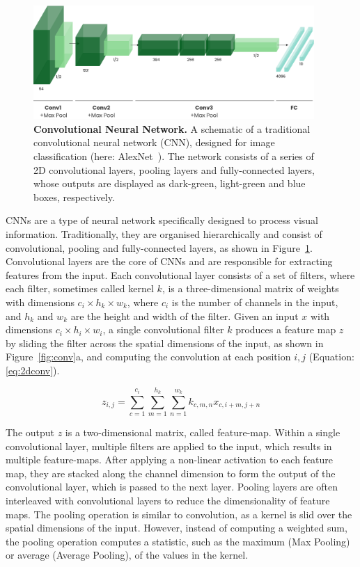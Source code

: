 \documentclass[a4paper]{article}
\begin{document}
\begin{figure}
  \begin{center}
    \includegraphics[width=0.95\textwidth]{./figures/alexnet.png}
  \end{center}
  \caption{\textbf{Convolutional Neural Network.} A schematic of a traditional
    convolutional neural network (CNN), designed for image classification (here:
    AlexNet~\cite{alexnet}). The network consists of a series of 2D
    convolutional layers, pooling layers and fully-connected layers, whose
  outputs are displayed as dark-green, light-green and blue boxes, respectively.
}
  \label{fig:cnn}
\end{figure}


CNNs are a type of neural network specifically designed to process visual
information. Traditionally, they are organised hierarchically and consist of
convolutional, pooling and fully-connected layers, as shown in
Figure~\ref{fig:cnn}. Convolutional layers are the core of CNNs and are
responsible for extracting features from the input. Each convolutional layer
consists of a set of filters, where each filter, sometimes called kernel $k$, is
a three-dimensional matrix of weights with dimensions $c_i \times h_k \times
w_k$, where $c_i$ is the number of channels in the input, and $h_k$ and $w_k$
are the height and width of the filter. Given an input $x$ with dimensions $c_i
\times h_i \times w_i$, a single convolutional filter $k$ produces a feature map
$z$ by sliding the filter across the spatial dimensions of the input, as shown
in Figure~\ref{fig:conv}a, and computing the convolution at each position
${i,j}$ (Equation: \ref{eq:2dconv}).

\begin{equation}
  z_{i,j} = \sum_{c=1}^{c_i} \sum_{m=1}^{h_k} \sum_{n=1}^{w_k} 
  k_{c,m,n} x_{c,i+m,j+n}
  \label{eq:2dconv}
\end{equation}

The output $z$ is a two-dimensional matrix, called feature-map. Within a single
convolutional layer, multiple filters are applied to the input, which results in
multiple feature-maps. After applying a non-linear activation to each feature
map, they are stacked along the channel dimension to form the output of the
convolutional layer, which is passed to the next layer. Pooling layers are often
interleaved with convolutional layers to reduce the dimensionality of feature
maps. The pooling operation is similar to convolution, as a kernel is slid over
the spatial dimensions of the input. However, instead of computing a weighted
sum, the pooling operation computes a statistic, such as the maximum (Max
Pooling) or average (Average Pooling), of the values in the kernel.
\end{document}
